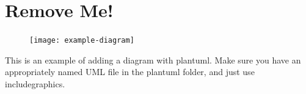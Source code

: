 \documentclass[12pt, letterpaper]{article}
\begin{document}
\appendix
\section{Remove Me!}
\begin{figure}[!ht]
    \centering
    \texttt{[image: example-diagram]}
\end{figure}
This is an example of adding a diagram with plantuml.
Make sure you have an appropriately named UML file in the plantuml folder,
and just use includegraphics.


% 
\end{document}
